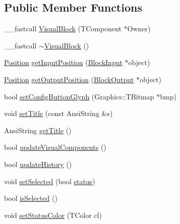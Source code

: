 \subsection*{Public Member Functions}
\begin{CompactItemize}
\item 
\_\-\_\-fastcall \hyperlink{classVisualBlock_19ba01bbc2f90d861528bf705b93aa05}{VisualBlock} (TComponent $\ast$Owner)
\item 
\_\-\_\-fastcall \hyperlink{classVisualBlock_88dac1befb8f8aa9d3435c8c35d1ffee}{$\sim$VisualBlock} ()
\item 
\hyperlink{structPosition}{Position} \hyperlink{classVisualBlock_f4bfdf59b184dd79ceaacb57f9acfd66}{getInputPosition} (\hyperlink{classBlockInput}{BlockInput} $\ast$object)
\item 
\hyperlink{structPosition}{Position} \hyperlink{classVisualBlock_840c712434dddf714a3cee9200073114}{getOutputPosition} (\hyperlink{classBlockOutput}{BlockOutput} $\ast$object)
\item 
bool \hyperlink{classVisualBlock_c7db3e3d6aabc762ea055453855c7448}{setConfigButtonGlyph} (Graphics::TBitmap $\ast$bmp)
\item 
void \hyperlink{classVisualBlock_62361923d36c7162a2ce8919e4f0949f}{setTitle} (const AnsiString \&s)
\item 
AnsiString \hyperlink{classVisualBlock_a7581d6b296ce3069bd7e16438fd330e}{getTitle} ()
\item 
bool \hyperlink{classVisualBlock_c484b8959917ac7901aad3ac60740b0d}{updateVisualComponents} ()
\item 
bool \hyperlink{classVisualBlock_22d016593be16c1d77e19c9a42d80afe}{updateHistory} ()
\item 
void \hyperlink{classVisualBlock_8ca3f7d1dcc59e9383df931ed57a76c1}{setSelected} (bool \hyperlink{classVisualBlock_848de7730beb758d3c427f99ab78deaf}{status})
\item 
bool \hyperlink{classVisualBlock_046a93138fb3800d114e176ab9e4c164}{isSelected} ()
\item 
void \hyperlink{classVisualBlock_849044a8c705427b0bce5a6808e53115}{setStatusColor} (TColor cl)
\end{CompactItemize}
